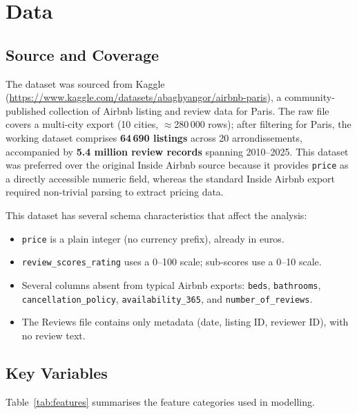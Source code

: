 \documentclass[12pt, a4paper]{article}
\begin{document}
\section{Data}
\label{sec:data}

\subsection{Source and Coverage}

The dataset was sourced from Kaggle (\url{https://www.kaggle.com/datasets/abaghyangor/airbnb-paris}), a community-published collection of Airbnb listing and review data for Paris. The raw file covers a multi-city export (10 cities, \(\approx\)280\,000 rows); after filtering for Paris, the working dataset comprises \textbf{64\,690 listings} across 20 arrondissements, accompanied by \textbf{5.4 million review records} spanning 2010--2025. This dataset was preferred over the original Inside Airbnb source because it provides \texttt{price} as a directly accessible numeric field, whereas the standard Inside Airbnb export required non-trivial parsing to extract pricing data.

This dataset has several schema characteristics that affect the analysis:
\begin{itemize}[itemsep=2pt]
  \item \texttt{price} is a plain integer (no currency prefix), already in euros.
  \item \texttt{review\_scores\_rating} uses a 0--100 scale; sub-scores use a 0--10 scale.
  \item Several columns absent from typical Airbnb exports: \texttt{beds}, \texttt{bathrooms}, \texttt{cancellation\_policy}, \texttt{availability\_365}, and \texttt{number\_of\_reviews}.
  \item The Reviews file contains only metadata (date, listing ID, reviewer ID), with no review text.
\end{itemize}

\subsection{Key Variables}

Table~\ref{tab:features} summarises the feature categories used in modelling.
\end{document}
